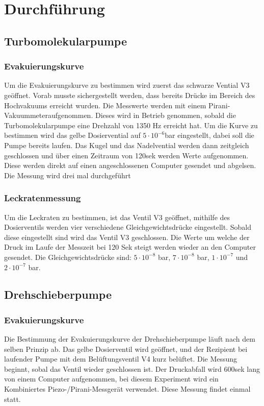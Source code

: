 \section{Durchführung}
\label{sec:Durchführung}

\subsection{Turbomolekularpumpe}
\subsubsection{Evakuierungskurve}

Um die Evakuierungskurve zu bestimmen wird zuerst das schwarze Vential V3 geöffnet.
Vorab musste sichergestellt werden, dass bereits Drücke im Bereich des Hochvakuums erreicht wurden.
Die Messwerte werden  mit einem Pirani-Vakuummeteraufgenommen.
Dieses wird in Betrieb genommen, sobald die Turbomolekularpumpe eine Drehzahl von 1350 Hz erreicht hat.
Um die Kurve zu bestimmen wird das gelbe Dosiervential auf $5\cdot 10^{-6}$bar eingestellt, dabei soll die Pumpe bereits laufen.
Das Kugel und das Nadelvential werden dann zeitgleich geschlossen und über einen Zeitraum von 120sek werden Werte
aufgenommen. Diese werden direkt auf einen angeschlossenen Computer gesendet und abgelsen.
Die Messung wird drei mal durchgeführt 

\subsubsection{Leckratenmessung}
Um die Leckraten zu bestimmen, ist das Ventil V3 geöffnet, mithilfe des Dosierventils werden vier verschiedene 
Gleichgewichtsdrücke eingestellt. Sobald diese eingestellt sind wird das Ventil V3 geschlossen. Die Werte um welche der Druck
im Laufe der Messzeit bei 120 Sek steigt werden wieder an den Computer gesendet. Die Gleichgewichtsdrücke sind:
$5\cdot 10^{-8}$ bar, $7\cdot 10^{-8}$ bar, $1\cdot 10^{-7}$ und $2\cdot 10^{-7}$ bar.


\subsection{Drehschieberpumpe}
\subsubsection{Evakuierungskurve}

Die Bestimmung der Evakuierungskurve der Drehschieberpumpe läuft nach dem selben Prinzip ab. Das gelbe Dosierventil wird geöffnet,
und der Rezipient bei laufender Pumpe mit dem Belüftungsventil V4 kurz belüftet. Die Messung beginnt, sobal das Ventil wieder geschlossen
ist. Der Druckabfall wird 600sek lang von einem Computer aufgenommen, bei diesem Experiment wird ein Kombiniertes Piezo-/Pirani-Messgerät
verwendet. Diese Messung findet einmal statt.

